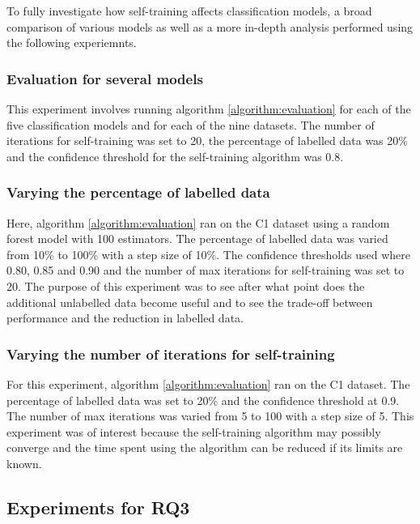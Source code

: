 \documentclass[../main.tex]{subfiles}
\begin{document}
To fully investigate how self-training affects classification models, a broad comparison of various models as well as a more in-depth analysis performed using the following experiemnts. 

\subsubsection{Evaluation for several models}

This experiment involves running algorithm \ref{algorithm:evaluation} for each of the five classification models and for each of the nine datasets. The number of iterations for self-training was set to 20, the percentage of labelled data was 20\% and the confidence threshold for the self-training algorithm was 0.8.  

\subsubsection{Varying the percentage of labelled data}

Here, algorithm \ref{algorithm:evaluation} ran on the C1 dataset using a random forest model with 100 estimators. The percentage of labelled data was varied from 10\% to 100\% with a step size of 10\%. The confidence thresholds used where 0.80, 0.85 and 0.90 and the number of max iterations for self-training was set to 20. The purpose of this experiment was to see after what point does the additional unlabelled data become useful and to see the trade-off between performance and the reduction in labelled data.

\subsubsection{Varying the number of iterations for self-training}

For this experiment, algorithm \ref{algorithm:evaluation} ran on the C1 dataset. The percentage of labelled data was set to 20\% and the confidence threshold at 0.9. The number of max iterations was varied from 5 to 100 with a step size of 5. This experiment was of interest because the self-training algorithm may possibly converge and the time spent using the algorithm can be reduced if its limits are known. 

\subsection{Experiments for RQ3}\label{section:case_study}
\end{document}
